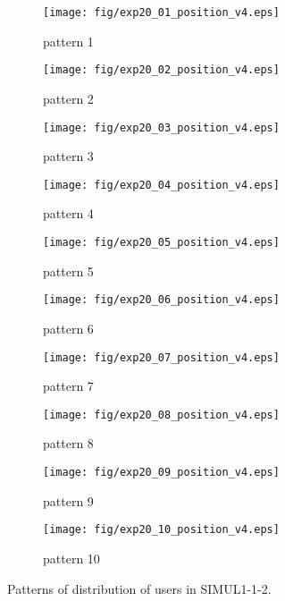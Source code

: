 	\begin{figure}
		\begin{center}
			\begin{subfigure}[b]{0.32\textwidth}
				\texttt{[image: fig/exp20\_01\_position\_v4.eps]}
				\caption{pattern 1}
				\label{figure:simul1_1_2_a}
			\end{subfigure}
			\begin{subfigure}[b]{0.32\textwidth}
				\texttt{[image: fig/exp20\_02\_position\_v4.eps]}
				\caption{pattern 2}
				\label{figure:simul1_1_2_b}
			\end{subfigure}
			\begin{subfigure}[b]{0.32\textwidth}
				\texttt{[image: fig/exp20\_03\_position\_v4.eps]}
				\caption{pattern 3}
				\label{figure:simul1_1_2_c}
			\end{subfigure}
			\begin{subfigure}[b]{0.32\textwidth}
				\texttt{[image: fig/exp20\_04\_position\_v4.eps]}
				\caption{pattern 4}
				\label{figure:simul1_1_2_d}
			\end{subfigure}
			\begin{subfigure}[b]{0.32\textwidth}
				\texttt{[image: fig/exp20\_05\_position\_v4.eps]}
				\caption{pattern 5}
				\label{figure:simul1_1_2_e}
			\end{subfigure}
			\begin{subfigure}[b]{0.32\textwidth}
				\texttt{[image: fig/exp20\_06\_position\_v4.eps]}
				\caption{pattern 6}
				\label{figure:simul1_1_2_f}
			\end{subfigure}
			\begin{subfigure}[b]{0.32\textwidth}
				\texttt{[image: fig/exp20\_07\_position\_v4.eps]}
				\caption{pattern 7}
				\label{figure:simul1_1_2_g}
			\end{subfigure}
			\begin{subfigure}[b]{0.32\textwidth}
				\texttt{[image: fig/exp20\_08\_position\_v4.eps]}
				\caption{pattern 8}
				\label{figure:simul1_1_2_h}
			\end{subfigure}
			\begin{subfigure}[b]{0.32\textwidth}
				\texttt{[image: fig/exp20\_09\_position\_v4.eps]}
				\caption{pattern 9}
				\label{figure:simul1_1_2_i}
			\end{subfigure}
			\begin{subfigure}[b]{0.32\textwidth}
				\texttt{[image: fig/exp20\_10\_position\_v4.eps]}
				\caption{pattern 10}
				\label{figure:simul1_1_2_j}
			\end{subfigure}
			\caption{Patterns of distribution of users in SIMUL1-1-2.}
			\label{figure:simul1_1_2_p}
		\end{center}
	\end{figure}

